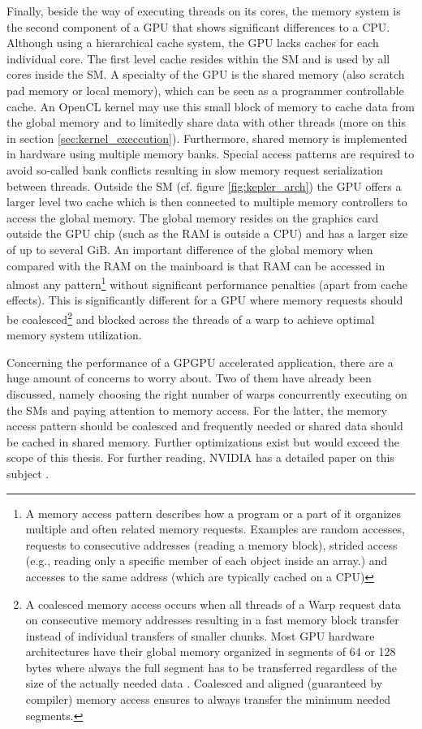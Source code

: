 Finally, beside the way of executing threads on its cores, the memory system is the second component of a GPU that shows significant differences to a CPU. Although using a hierarchical cache system, the GPU lacks caches for each individual core. The first level cache resides within the SM and is used by all cores inside the SM. A specialty of the GPU is the shared memory (also scratch pad memory or local memory), which can be seen as a programmer controllable cache. An OpenCL kernel may use this small block of memory to cache data from the global memory and to limitedly share data with other threads (more on this in section \ref{sec:kernel_execcution}). Furthermore, shared memory is implemented in hardware using multiple memory banks. Special access patterns are required to avoid so-called bank conflicts resulting in slow memory request serialization between threads. Outside the SM (cf. figure \ref{fig:kepler_arch}) the GPU offers a larger level two cache which is then connected to multiple memory controllers to access the global memory. The global memory resides on the graphics card outside the GPU chip (such as the RAM is outside a CPU) and has a larger size of up to several GiB. An important difference of the global memory when compared with the RAM on the mainboard is that RAM can be accessed in almost any pattern\footnote{A memory access pattern describes how a program or a part of it organizes multiple and often related memory requests. Examples are random accesses, requests to consecutive addresses (reading a memory block), strided access (e.g., reading only a specific member of each object inside an array.) and accesses to the same address (which are typically cached on a CPU)} without significant performance penalties (apart from cache effects). This is significantly different for a GPU where memory requests should be coalesced\footnote{A coalesced memory access occurs when all threads of a Warp request data on consecutive memory addresses resulting in a fast memory block transfer instead of individual transfers of smaller chunks. Most GPU hardware architectures have their global memory organized in segments of 64 or 128 bytes where always the full segment has to be transferred regardless of the size of the actually needed data \cite[p.13]{nvidia_opencl_best_practices}. Coalesced and aligned (guaranteed by compiler) memory access ensures to always transfer the minimum needed segments.} and blocked across the threads of a warp to achieve optimal memory system utilization.

Concerning the performance of a GPGPU accelerated application, there are a huge amount of concerns to worry about. Two of them have already been discussed, namely choosing the right number of warps concurrently executing on the SMs and paying attention to memory access. For the latter, the memory access pattern should be coalesced and frequently needed or shared data should be cached in shared memory. Further optimizations exist but would exceed the scope of this thesis. For further reading, NVIDIA has a detailed paper on this subject \cite{gpu_optimizations}.

